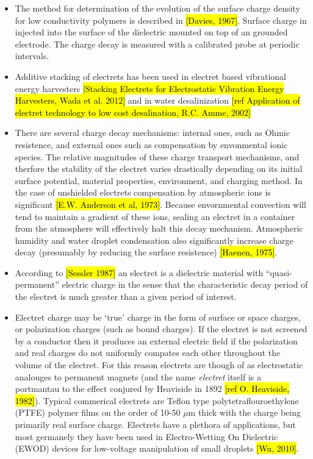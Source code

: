 \documentclass[10pt,a4paper]{article}
\begin{document}
\begin{itemize}
\item The method for determination of the evolution of the surface charge density for low conductivity polymers is described in \hl{[Davies, 1967]}. Surface charge in injected into the surface of the dielectric mounted on top of an grounded electrode. The charge decay is measured with a calibrated probe at periodic intervals.
\item Additive stacking of electrets has been used in electret based vibrational energy harvesters \hl{[Stacking Electrets for Electrostatic Vibration Energy Harvesters, Wada et al. 2012]} and in water desalinization \hl{[ref Application of electret technology to low cost desalination, R.C. Amme, 2002]}
\item There are several charge decay mechanisms: internal ones, such as Ohmic resistence, and external ones such as compensation by envonmental ionic species. The relative magnitudes of these charge transport mechanisms, and therfore the stability of the electret varies drastically depending on its initial surface potential, material properties, environment, and charging method. In the case of unshielded electrets compensation by atmospheric ions is significant \hl{[E.W. Anderson et al, 1973]}. Because envornmental convection will tend to  maintain a gradient of these ions, sealing an electret in a container from the atmosphere will effectively halt this decay mechanism. Atmospheric humidity and water droplet condensation also significantly increase charge decay (presumably by reducing the surface resistence) \hl{[Haenen, 1975]}.
\item According to \hl{[Sessler 1987]} an electret is a dielectric material with ``quasi-permanent'' electric charge in the sense that the characteristic decay period of the electret is much greater than a given period of interest.
\item Electret charge may be `true' charge in the form of surface or space charges, or polarization charges (such as bound charges). If the electret is not screened by a conductor then it produces an external electric field if the polarization and real charges do not uniformly compates each other throughout the volume of the electret. For this reason electrets are though of as electrostatic analouges to permanent magnets (and the name \emph{electret} itself is a portmantau to the effect conjured by Heaviside in 1892 \hl{[ref O. Heaviside, 1982]}). Typical commerical electrets are Teflon type polytetraflouroethylene (PTFE) polymer films on the order of 10-50 $\mu$m thick with the charge being primarily real surface charge. Electrets have a plethora of applications, but most germanely they have been used in Electro-Wetting On Dielectric (EWOD) devices for low-voltage manipulation of small droplets \hl{[Wu, 2010]}. 

\end{itemize}
\end{document}
